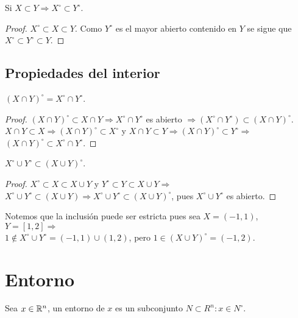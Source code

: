 \begin{corollary}
  Si $X \subset Y \Rightarrow X^{\circ} \subset Y^{\circ}$.
  \begin{proof}
    $X^{\circ} \subset X \subset Y$. Como $Y^{\circ}$ es el mayor abierto contenido en $Y$ se sigue que $X^{\circ} \subset Y^{\circ} \subset Y$.
  \end{proof}
\end{corollary}

\subsection{Propiedades del interior}

\begin{prop}
  $(X \cap Y)^{\circ} = X^{\circ} \cap Y^{\circ}$.
  \begin{proof}
    $(X \cap Y)^{\circ} \subset X \cap Y \Rightarrow X^{\circ} \cap Y^{\circ}$ es abierto $\Rightarrow (X^{\circ} \cap Y^{\circ}) \subset (X \cap Y)^{\circ}$. \\
    $X \cap Y \subset X \Rightarrow (X \cap Y)^{\circ} \subset X^{\circ}$ y $X \cap Y \subset Y \Rightarrow (X \cap Y)^{\circ} \subset Y^{\circ} \Rightarrow$ \\
    $(X \cap Y)^{\circ} \subset X^{\circ} \cap Y^{\circ}$.
  \end{proof}
\end{prop}

\begin{prop}
  $X^{\circ} \cup Y^{\circ} \subset (X \cup Y)^{\circ}$.
  \begin{proof}
    $X^{\circ} \subset X \subset X \cup Y$ y $Y^{\circ} \subset Y \subset X \cup Y \Rightarrow$ \\
    $X^{\circ} \cup Y^{\circ} \subset (X \cup Y) \Rightarrow X^{\circ} \cup Y^{\circ} \subset (X \cup Y)^{\circ}$, pues $X^{\circ} \cup Y^{\circ}$ es abierto.
  \end{proof}
\end{prop}

Notemos que la inclusión puede ser estricta pues sea $X = (-1, 1)$, $Y = [1, 2] \Rightarrow$ \\
$1 \notin X^{\circ} \cup Y^{\circ} = (-1, 1) \cup (1, 2)$, pero $1 \in (X \cup Y)^{\circ} = (-1, 2)$.

\section{Entorno}

\begin{definition}[Entorno]
  Sea $x \in \mathbb{R}^n$, un entorno de $x$ es un subconjunto $N \subset R^n : x \in N^{\circ}$.
\end{definition}

